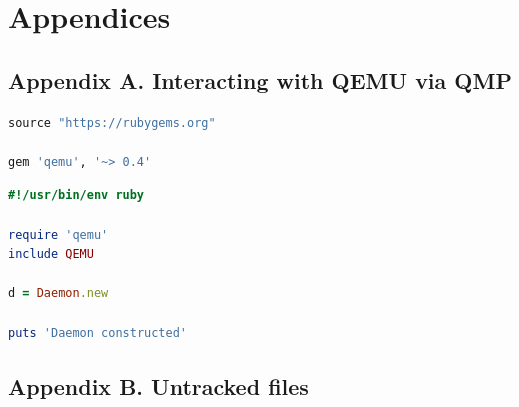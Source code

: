 \documentclass[]{report}
\begin{document}
\chapter{Appendices}\label{appendices}

\section{Appendix A. Interacting with QEMU via
QMP}\label{appendix-a.-interacting-with-qemu-via-qmp}

\begin{lstlisting}[language=Ruby, style=code, caption=Gemfile]
source "https://rubygems.org" 

gem 'qemu', '~> 0.4'
\end{lstlisting}

\begin{lstlisting}[language=Ruby, style=code, caption=main.rb]
#!/usr/bin/env ruby

require 'qemu'
include QEMU

d = Daemon.new

puts 'Daemon constructed'
\end{lstlisting}

\section{Appendix B. Untracked files}\label{appendix-b.-untracked-files}
\end{document}
